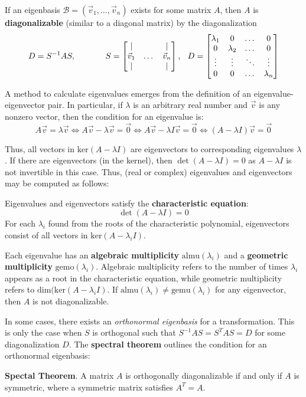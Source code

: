 \begin{shaded}
If an eigenbasis $\mathcal{B}=(\vec{v}_1,\dots,\vec{v}_n)$ exists for some matrix $A$, then $A$ is \textbf{diagonalizable} (similar to a diagonal matrix) by the diagonalization \[D = S^{-1}AS,\hspace{0.5in}S = \begin{bmatrix}
    | & & |\\
    \vec{v}_1 & \dots & \vec{v}_n\\
    | & & |
\end{bmatrix},\hspace{0.1in}D = \begin{bmatrix}
    \lambda_1 & 0 & \dots & 0\\
    0 & \lambda_2 & \dots & 0\\
    \vdots & \vdots & \ddots & \vdots\\
    0 & 0 & \dots & \lambda_n
\end{bmatrix}\]
\end{shaded}

\newpage

A method to calculate eigenvalues emerges from the definition of an eigenvalue-eigenvector pair. In particular, if $\lambda$ is an arbitrary real number and $\vec{v}$ is any nonzero vector, then the condition for an eigenvalue is: \[A\vec{v}=\lambda\vec{v} \iff A\vec{v}-\lambda\vec{v} = \vec{0} \iff A\vec{v}-\lambda I\vec{v} = \vec{0} \iff (A-\lambda I)\vec{v} = \vec{0}\]

Thus, all vectors in $\text{ker}(A-\lambda I)$ are eigenvectors to corresponding eigenvalues $\lambda$. If there are eigenvectors (in the kernel), then $\det(A-\lambda I) = 0$ as $A-\lambda I$ is not invertible in this case. Thus, (real or complex) eigenvalues and eigenvectors may be computed as follows:

\begin{shaded}
    Eigenvalues and eigenvectors satisfy the \textbf{characteristic equation}: \[\det (A-\lambda I) = 0\] For each $\lambda_i$ found from the roots of the characteristic polynomial, eigenvectors consist of all vectors in $\text{ker}(A-\lambda_i I)$.
\end{shaded}

Each eigenvalue has an \textbf{algebraic multiplicity} $\text{almu}(\lambda_i)$ and a \textbf{geometric multiplicity} $\text{gemo}(\lambda_i)$. Algebraic multiplicity refers to the number of times $\lambda_i$ appears as a root in the characteristic equation, while geometric multiplicity refers to $\text{dim}(\text{ker}(A-\lambda_iI)$. If $\text{almu}(\lambda_i)\neq\text{gemu}(\lambda_i)$ for any eigenvector, then $A$ is not diagonalizable.

In some cases, there exists an \textit{orthonormal eigenbasis} for a transformation. This is only the case when $S$ is orthogonal such that $S^{-1}AS = S^T A S = D$ for some diagonalization $D$. The \textbf{spectral theorem} outlines the condition for an orthonormal eigenbasis:

\begin{shaded}
    \textbf{Spectal Theorem}. A matrix $A$ is orthogonally diagonalizable if and only if $A$ is symmetric, where a symmetric matrix satisfies $A^T=A$.
\end{shaded}